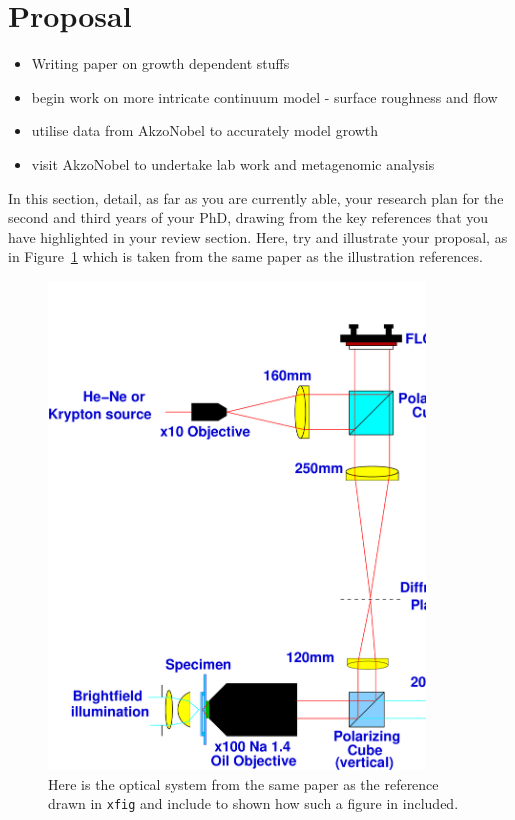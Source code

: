 \documentclass[a4paper,12pt]{article}
\begin{document}
\section{Proposal}

\begin{itemize}
 \item Writing paper on growth dependent stuffs
 \item begin work on more intricate continuum model - surface roughness and flow
 \item utilise data from AkzoNobel to accurately model growth
 \item visit AkzoNobel to undertake lab work and metagenomic analysis
\end{itemize}


In this section, detail, as far as you are currently able, 
your research plan for the second and third years of your PhD, 
drawing from the key references \cite{jr:block} that you have highlighted in your review section. 
Here, try and illustrate
your proposal, as in Figure~\ref{fig:prism} which is taken from the
same paper as the illustration references.
%
%
\begin{figure}[htb]     %
        \begin{center}
          \includegraphics[width=100mm]{OpticalSystem}
\end{center}
\caption{Here is the optical system from the same paper
  as the reference drawn in {\tt xfig} and include to
  shown how such a figure in included.}
\label{fig:prism}                 %
\end{figure}
\end{document}
